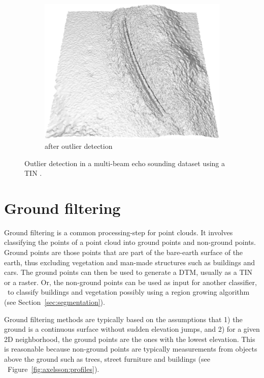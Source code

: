 \begin{figure}[htb]
\begin{subfigure}[b]{0.4\linewidth}
    \includegraphics[width=\textwidth]{figs/mbes_cleaning_after.png}
    \caption{after outlier detection}
  \end{subfigure}
\caption{Outlier detection in a multi-beam echo sounding dataset using a TIN \citep{Arge10}.}
\label{fig:mbes}
\end{figure}



%

\section{Ground filtering}
Ground filtering is a common processing-step for point clouds.
It involves classifying the points of a point cloud into ground points and non-ground points.
Ground points are those points that are part of the bare-earth surface of the earth, thus excluding vegetation and man-made structures such as buildings and cars.
The ground points can then be used to generate a DTM, usually as a TIN or a raster.
Or, the non-ground points can be used as input for another classifier, \eg\ to classify buildings and vegetation possibly using a region growing algorithm (see Section~\ref{sec:segmentation}).

Ground filtering methods are typically based on the assumptions that 1) the ground is a continuous surface without sudden elevation jumps, and 2) for a given 2D neighborhood, the ground points are the ones with the lowest elevation.
This is reasonable because non-ground points are typically measurements from objects above the ground such as trees, street furniture and buildings (see \eg\ Figure~\ref{fig:axelsson:profiles}).

